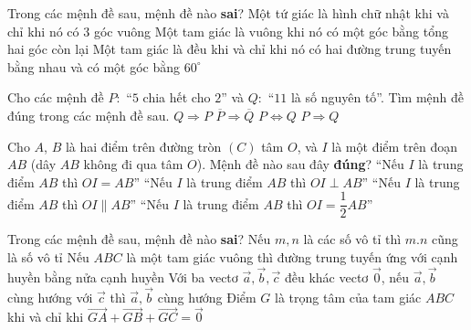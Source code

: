 \begin{ex}%
	Trong các mệnh đề sau, mệnh đề nào  \textbf{sai}?
		{Một tứ giác là hình chữ nhật khi và chỉ khi nó có $3$ góc  vuông}
		{Một tam giác là vuông khi nó có một góc bằng tổng hai  góc còn lại}
		{Một tam giác là đều khi và chỉ khi nó có hai đường trung tuyến bằng nhau và có một góc bằng $60^{\circ}$} 
\end{ex}

\begin{ex}%
	Cho các mệnh đề $ P:$ “$5$ chia hết cho $2$” và $Q:$ “$11$ là  số nguyên tố”. Tìm mệnh đề đúng trong các mệnh đề sau.
	\choice 
		{$Q  \Rightarrow P$}
		{$\overline{P} \Rightarrow  \overline{Q}$}
		{$P \Leftrightarrow Q$} 
		{\True  $P \Rightarrow Q$}
\end{ex}

\begin{ex}%
	Cho $A$, $B$ là hai điểm trên đường tròn $(C)$ tâm $O$, và $I$ là một điểm trên đoạn $AB$  (dây $AB$ không đi qua tâm $O$). Mệnh đề nào sau đây \textbf{đúng}?
	\choice 
		{``Nếu $I$ là trung điểm $AB$ thì $OI=AB$''} 
		{\True ``Nếu $I$ là  trung điểm $AB$ thì $OI \perp AB$''}
		{``Nếu $I$ là trung điểm $AB$ thì  $OI \parallel AB$''}
		{``Nếu  $I$ là trung điểm $AB$ thì $OI =\dfrac{1}{2}AB$''}
\end{ex}

\begin{ex}%
	Trong các mệnh đề sau, mệnh đề nào  \textbf{sai}?
	\choice 
		{\True Nếu $m,n$  là các số vô tỉ thì $m.n$ cũng là số vô tỉ}
		{Nếu $ABC$ là một tam giác vuông thì đường trung tuyến ứng với cạnh huyền bằng nửa  cạnh huyền}
		{Với ba vectơ $\overrightarrow{a},\overrightarrow{b},\overrightarrow{c}$  đều khác vectơ $\overrightarrow{0}$, nếu $\overrightarrow{a},\overrightarrow{b}$ cùng hướng với $\overrightarrow{c}$ thì $\overrightarrow{a},\overrightarrow{b}$ cùng hướng}
		{Điểm $G$  là trọng tâm của tam giác $ABC$ khi và chỉ khi $\overrightarrow{GA}+\overrightarrow{GB}+\overrightarrow{GC}=\overrightarrow{0}$}
\end{ex}

